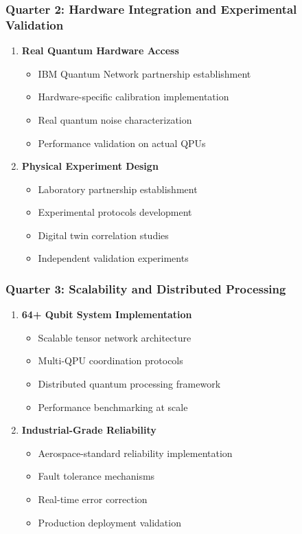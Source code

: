 \documentclass[12pt,a4paper]{article}
\begin{document}
\subsubsection{Quarter 2: Hardware Integration and Experimental Validation}
\begin{enumerate}
    \item \textbf{Real Quantum Hardware Access}
    \begin{itemize}
        \item IBM Quantum Network partnership establishment
        \item Hardware-specific calibration implementation
        \item Real quantum noise characterization
        \item Performance validation on actual QPUs
    \end{itemize}
    
    \item \textbf{Physical Experiment Design}
    \begin{itemize}
        \item Laboratory partnership establishment
        \item Experimental protocols development
        \item Digital twin correlation studies
        \item Independent validation experiments
    \end{itemize}
\end{enumerate}

\subsubsection{Quarter 3: Scalability and Distributed Processing}
\begin{enumerate}
    \item \textbf{64+ Qubit System Implementation}
    \begin{itemize}
        \item Scalable tensor network architecture
        \item Multi-QPU coordination protocols
        \item Distributed quantum processing framework
        \item Performance benchmarking at scale
    \end{itemize}
    
    \item \textbf{Industrial-Grade Reliability}
    \begin{itemize}
        \item Aerospace-standard reliability implementation
        \item Fault tolerance mechanisms
        \item Real-time error correction
        \item Production deployment validation
    \end{itemize}
\end{enumerate}
\end{document}
